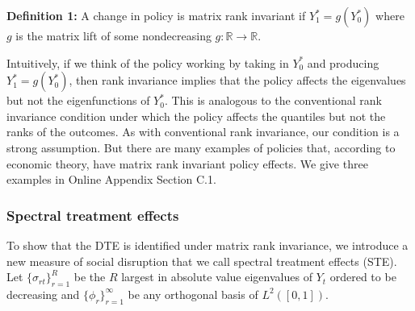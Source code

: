 \documentclass[12pt]{article}
\theoremstyle{definition}
\begin{document}
\begin{flushleft}
\textbf{Definition 1:} A change in policy is matrix rank invariant if $Y^{*}_{1} =  g(Y^{*}_{0})$ where $g$ is the matrix lift of some nondecreasing $g : \mathbb{R} \to \mathbb{R}$. 
\end{flushleft}   

Intuitively, if we think of the policy working by taking in $Y_{0}^{*}$ and producing $Y_{1}^{*} = g(Y_{0}^{*})$, then rank invariance implies that the policy affects the eigenvalues but not the eigenfunctions of $Y_{0}^{*}$. This is analogous to the conventional rank invariance condition under which the policy affects the quantiles but not the ranks of the outcomes. As with conventional rank invariance, our condition is a strong assumption. But there are many examples of policies that, according to economic theory, have matrix rank invariant policy effects. We give three examples in Online Appendix Section C.1.      

\subsubsection{Spectral treatment effects}
To show that the DTE is identified under matrix rank invariance, we introduce a new measure of social disruption that we call spectral treatment effects (STE). Let $\{\sigma_{rt}\}_{r=1}^{R}$ be the $R$ largest in absolute value eigenvalues of $Y_{t}$ ordered to be decreasing and $\{\phi_{r}\}_{r=1}^{\infty}$ be any orthogonal basis of $L^{2}([0,1])$.   
 
\end{document}
